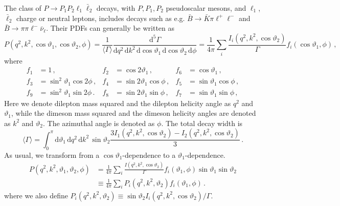 \documentclass[aps,prd,reprint,nofootinbib,preprintnumbers]{revtex4}
\newcommand{\dd}{\text{d}}
\renewcommand{\theta}{\vartheta}
\begin{document}
The class of $P\to P_1 P_2 \ell_1\bar\ell_2$ decays, with $P,P_1,P_2$ pseudoscalar mesons,
and $\ell_1$, $\bar\ell_2$ charge or neutral leptons, includes decays
such as e.g. $\bar{B}\to\bar{K}\pi\ell^+\ell^-$ and $\bar{B}\to \pi\pi\ell^-\bar\nu_\ell$.
Their PDFs can generally be written as \cite{Lee:1992ih}
\begin{equation}
    P(q^2, k^2, \cos\theta_1, \cos \theta_2, \phi) = \frac{1}{\langle \Gamma\rangle}\frac{\dd^5 \Gamma}{\dd q^2\,\dd k^2\, \dd\cos\theta_1\,\dd\cos\theta_2\,\dd\phi} = \frac{1}{4\pi} \sum_i \frac{I_i(q^2, k^2, \cos\theta_2)}{\Gamma} f_i(\cos\theta_1,\phi)\,,
\end{equation}
where
\begin{equation}
\begin{aligned}
    f_1 & = 1\,,              &
    f_2 & = \cos 2\theta_1\,, &
    f_6 & = \cos  \theta_1\,, \\
    f_3 & = \sin^2\theta_1 \cos 2\phi\,,&
    f_4 & = \sin 2\theta_1 \cos  \phi\,,&
    f_5 & = \sin  \theta_1 \cos  \phi\,,\\
    f_9 & = \sin^2\theta_1 \sin 2\phi\,.&
    f_8 & = \sin 2\theta_1 \sin  \phi\,,&
    f_7 & = \sin  \theta_1 \sin  \phi\,,
\end{aligned}
\end{equation}
Here we denote dilepton mass squared and the dilepton helicity angle as $q^2$ and $\theta_1$, while
the dimeson mass squared and the dimeson helicity angles are denoted as $k^2$ and $\theta_2$. The
azimuthal angle is denoted as $\phi$. The total decay width is
\begin{equation}
    \langle \Gamma\rangle = \int_0^\pi \dd\theta_1\,\dd q^2\,\dd k^2\,\sin\theta_2 \frac{3I_1(q^2, k^2, \cos\theta_2) - I_2(q^2, k^2, \cos\theta_2)}{3}\,.
\end{equation}
As usual, we transform from a $\cos\theta_1$-dependence to a $\theta_1$-dependence.
\begin{equation}
\begin{aligned}
    P(q^2, k^2, \theta_1, \theta_2, \phi)
    & = \frac{1}{4\pi} \sum_i \frac{I(q^2, k^2, \cos\theta_2)}{\Gamma} f_i(\theta_1, \phi) \sin\theta_1 \sin\theta_2\\
    & \equiv \frac{1}{4\pi} \sum_i P_i(q^2, k^2, \theta_2) f_i(\theta_1, \phi)\,.
\end{aligned}
\end{equation}
where we also define $P_i(q^2, k^2, \theta_2) \equiv \sin\theta_2 I_i(q^2, k^2, \cos\theta_2) / \Gamma$.\\
\end{document}
